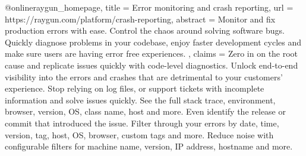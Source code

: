 @online{raygun_homepage,
  title = {Error monitoring and crash reporting},
  url = {https://raygun.com/platform/crash-reporting},
  abstract = {
    Monitor and fix production errors with ease. Control the chaos around solving software bugs. Quickly diagnose problems in your codebase, enjoy faster development cycles and make sure users are having error free experiences.
  },
  claims = {
    Zero in on the root cause and replicate issues quickly with code-level diagnostics. Unlock end-to-end visibility into the errors and crashes that are detrimental to your customers’ experience. Stop relying on log files, or support tickets with incomplete information and solve issues quickly. See the full stack trace, environment, browser, version, OS, class name, host and more. Even identify the release or commit that introduced the issue. Filter through your errors by date, time, version, tag, host, OS, browser, custom tags and more. Reduce noise with configurable filters for machine name, version, IP address, hostname and more.
  }
}